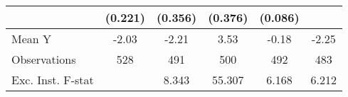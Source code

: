 {\begin{tabular}{l*{5}{c}}
            &     (0.221)         &     (0.356)         &     (0.376)         &     (0.086)         &                     \\
\midrule
Mean Y      &       -2.03         &       -2.21         &        3.53         &       -0.18         &       -2.25         \\
Observations&         528         &         491         &         500         &         492         &         483         \\
Exc. Inst. F-stat&                     &       8.343         &      55.307         &       6.168         &       6.212         \\
\bottomrule
\end{tabular}
}

